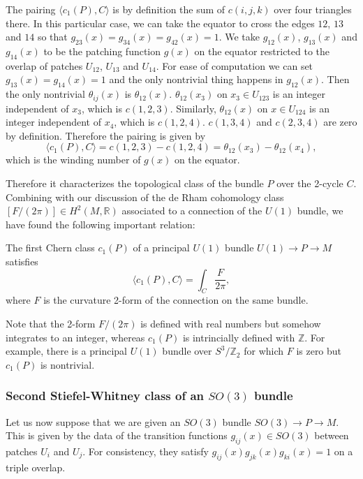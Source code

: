 \documentclass[12pt]{article}
\numberwithin{equation}{section}
\numberwithin{figure}{section}
\theoremstyle{remark}
\def\bR{\mathbb{R}}
\def\bZ{\mathbb{Z}}
\begin{document}
The pairing $\langle c_1(P),C\rangle$ is by definition 
the sum of $c(i,j,k)$ over four triangles there.
In this particular case, we can take the equator to cross the edges $12$, $13$ and $14$ so that $g_{23}(x)=g_{34}(x)=g_{42}(x)=1$. 
We take $g_{12}(x)$, $g_{13}(x)$ and $g_{14}(x)$ to be the patching function $g(x)$ on the equator restricted to the overlap of patches $U_{12}$, $U_{13}$ and $U_{14}$.
For ease of computation we can set $g_{13}(x)=g_{14}(x)=1$ 
and the only nontrivial thing happens in $g_{12}(x)$.
Then the only nontrivial $\theta_{ij}(x)$ is $\theta_{12}(x)$.
$\theta_{12}(x_3)$ on $x_3\in U_{123}$ is an integer independent of $x_3$, which is $c(1,2,3)$. 
Similarly, $\theta_{12}(x)$ on $x\in U_{124}$ is an integer independent of $x_4$, which is $c(1,2,4)$.
$c(1,3,4)$ and $c(2,3,4)$ are zero by definition.
Therefore the pairing is given by \begin{equation}
\langle c_1(P),C\rangle = c(1,2,3) - c(1,2,4) = \theta_{12}(x_3)-\theta_{12}(x_4),
\end{equation} which is the winding number of $g(x)$ on the equator. 

Therefore it characterizes the topological class of the bundle $P$ over the 2-cycle $C$.
Combining with our discussion of the de Rham cohomology class $[F/(2\pi)]\in H^2(M,\bR)$ associated to a connection of the $U(1)$ bundle, 
we have found the following important relation:
\begin{proposition}
  The first Chern class $c_1(P)$ of a principal $U(1)$ bundle $U(1)\to P\to M$ 
  satisfies 
  \begin{equation}
    \langle c_1(P),C\rangle = \int_C \frac{F}{2\pi},
  \end{equation}
  where $F$ is the curvature 2-form of the connection on the same bundle.
\end{proposition}

Note that the 2-form $F/(2\pi)$ is defined with real numbers but somehow integrates to an integer,
whereas $c_1(P)$ is intrincially defined with $\bZ$.
For example, there is a principal $U(1)$ bundle over $S^3/\bZ_2$
for which $F$ is zero but $c_1(P)$ is nontrivial.

\subsubsection{Second Stiefel-Whitney class of an $SO(3)$ bundle}

Let us now suppose that we are given an $SO(3)$ bundle $SO(3)\to P\to M$.
This is given by the data of the transition functions $g_{ij}(x)\in SO(3)$
between patches $U_i$ and $U_j$.
For consistency, they satisfy $g_{ij}(x)g_{jk}(x)g_{ki}(x)=1$ on a triple overlap.
\end{document}
